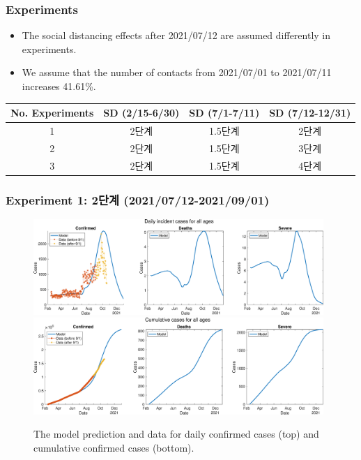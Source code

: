 \documentclass[aspectratio=169, 9pt, xcolor=dvipsnames]{beamer}
\begin{document}
	\begin{frame}\frametitle{Experiments}
	    \begin{itemize}
	    	\item The social distancing effects after 2021/07/12 are assumed differently in experiments.
	    	\item We assume that the number of contacts from 2021/07/01 to 2021/07/11 increases 41.61\%.
	    \end{itemize}
	    \begin{table}
	    	\begin{tabular}{cccc}
	    		\toprule
	    		\textbf{No. Experiments} & \textbf{SD (2/15-6/30)} & \textbf{SD (7/1-7/11)} & \textbf{SD (7/12-12/31)} \\
	    		\midrule
	 			1 & 2단계 & 1.5단계 & \textcolor{NavyBlue}{2단계} \\
	 			2 & 2단계 & 1.5단계 & \textcolor{NavyBlue}{3단계} \\
	 			3 & 2단계 & 1.5단계 & \textcolor{NavyBlue}{4단계} \\
	    		\bottomrule
	    	\end{tabular}
	    \end{table}
	\end{frame}

	\begin{frame}\frametitle{Experiment 1: 2단계 (2021/07/12-2021/09/01)}
	    \begin{figure}
	    	\centering
	    	\includegraphics[width=11cm]{../results/predict_exp_1_sd3_same_school_same/daily_all_age.eps}
	    	\includegraphics[width=11cm]{../results/predict_exp_1_sd3_same_school_same/cumul_all_age.eps}
	    	\caption{The model prediction and data for daily confirmed cases (top) and cumulative confirmed cases (bottom).}
	    \end{figure}
	\end{frame}
\end{document}
